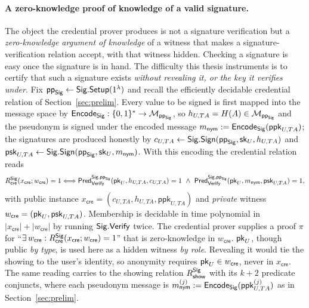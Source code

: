 \paragraph{A zero-knowledge proof of knowledge of a valid signature.}
The object the credential prover produces is not a signature verification but a \emph{zero-knowledge argument of knowledge} of a witness that makes a signature-verification relation accept, with that witness hidden. Checking a signature is easy once the signature is in hand. The difficulty this thesis instruments is to certify that such a signature exists \emph{without revealing it, or the key it verifies under}. Fix $\mathsf{pp}_{\mathsf{Sig}}\leftarrow\mathsf{Sig}.\mathsf{Setup}(1^\lambda)$ and recall the efficiently decidable credential relation of Section~\ref{sec:prelim}. Every value to be signed is first mapped into the message space by $\mathsf{Encode}_{\mathsf{Sig}}:\{0,1\}^{\ast}\to\mathcal{M}_{\mathsf{pp}_{\mathsf{Sig}}}$, so $h_{U,TA}=H(A)\in\mathcal{M}_{\mathsf{pp}_{\mathsf{Sig}}}$ and the pseudonym is signed under the encoded message $m_{\mathsf{nym}}:=\mathsf{Encode}_{\mathsf{Sig}}(\mathsf{ppk}_{U,TA})$; the signatures are produced honestly by $c_{U,TA}\leftarrow\mathsf{Sig}.\mathsf{Sign}(\mathsf{pp}_{\mathsf{Sig}},\mathsf{sk}_U,h_{U,TA})$ and $\mathsf{psk}_{U,TA}\leftarrow\mathsf{Sig}.\mathsf{Sign}(\mathsf{pp}_{\mathsf{Sig}},\mathsf{sk}_U,m_{\mathsf{nym}})$. With this encoding the credential relation reads
\begin{equation*}
  R_{\mathsf{cre}}^{\mathsf{Sig}}(x_{\mathsf{cre}};w_{\mathsf{cre}})=1
  \Longleftrightarrow
  \mathsf{Pred}_{\mathsf{Verify}}^{\mathsf{Sig},\mathsf{pp}_{\mathsf{Sig}}}(\mathsf{pk}_U,h_{U,TA},c_{U,TA})=1
  \ \land\
  \mathsf{Pred}_{\mathsf{Verify}}^{\mathsf{Sig},\mathsf{pp}_{\mathsf{Sig}}}(\mathsf{pk}_U,m_{\mathsf{nym}},\mathsf{psk}_{U,TA})=1,
\end{equation*}
with public instance $x_{\mathsf{cre}}=(c_{U,TA},h_{U,TA},\mathsf{ppk}_{U,TA})$ and \emph{private} witness $w_{\mathsf{cre}}=(\mathsf{pk}_U,\mathsf{psk}_{U,TA})$. Membership is decidable in time polynomial in $|x_{\mathsf{cre}}|+|w_{\mathsf{cre}}|$ by running $\mathsf{Sig}.\mathsf{Verify}$ twice. The credential prover supplies a proof $\pi$ for ``$\exists\,w_{\mathsf{cre}}:R_{\mathsf{cre}}^{\mathsf{Sig}}(x_{\mathsf{cre}};w_{\mathsf{cre}})=1$'' that is zero-knowledge in $w_{\mathsf{cre}}$. $\mathsf{pk}_U$, though public \emph{by type}, is used here as a hidden witness \emph{by role}. Revealing it would tie the showing to the user's identity, so anonymity requires $\mathsf{pk}_U\in w_{\mathsf{cre}}$, never in $x_{\mathsf{cre}}$. The same reading carries to the showing relation $R_{\mathsf{show}}^{\mathsf{Sig}}$ with its $k+2$ predicate conjuncts, where each pseudonym message is $m_{\mathsf{nym}}^{(j)}:=\mathsf{Encode}_{\mathsf{Sig}}(\mathsf{ppk}_{U,TA}^{(j)})$ as in Section~\ref{sec:prelim}.


